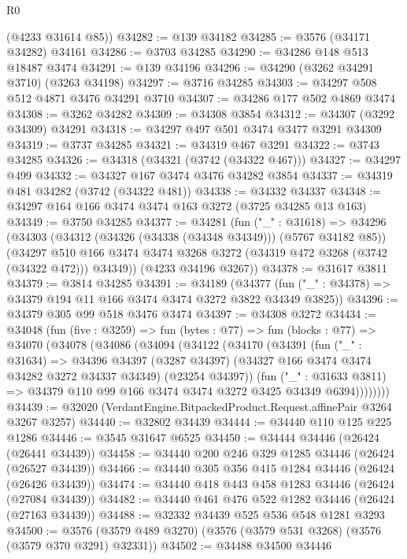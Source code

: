 \begin{lexlean}{R0}
\begin{coremodule}
      (@4233 @31614 @85))
@34282 := @139 @34182
@34285 := @3576 (@34171 @34282) @34161
@34286 := @3703 @34285
@34290 := @34286 @148 @513 @18487 @3474
@34291 := @139 @34196
@34296 := @34290 (@3262 @34291 @3710) (@3263 @34198)
@34297 := @3716 @34285
@34303 := @34297 @508 @512 @4871 @3476 @34291 @3710
@34307 := @34286 @177 @502 @4869 @3474
@34308 := @3262 @34282
@34309 := @34308 @3854
@34312 := @34307 (@3292 @34309) @34291
@34318 := @34297 @497 @501 @3474 @3477 @3291 @34309
@34319 := @3737 @34285
@34321 := @34319 @467 @3291
@34322 := @3743 @34285
@34326 := @34318 (@34321 (@3742 (@34322 @467)))
@34327 := @34297 @499
@34332 := @34327 @167 @3474 @3476 @34282 @3854
@34337 := @34319 @481 @34282 (@3742 (@34322 @481))
@34338 := @34332 @34337
@34348 := @34297 @164 @166 @3474 @3474 @163 @3272 (@3725 @34285 @13 @163)
@34349 := @3750 @34285
@34377 := @34281
    (fun ("_" : @31618) =>
    @34296
      (@34303
        (@34312 (@34326 (@34338 (@34348 @34349))) (@5767 @34182 @85))
        (@34297 @510 @166 @3474 @3474 @3268 @3272 (@34319 @472 @3268 (@3742 (@34322 @472))) @34349))
      (@4233 @34196 @3267))
@34378 := @31617 @3811
@34379 := @3814 @34285
@34391 := @34189
    (@34377 (fun ("_" : @34378) => @34379 @194 @11 @166 @3474 @3474 @3272 @3822 @34349 @3825))
@34396 := @34379 @305 @99 @518 @3476 @3474
@34397 := @34308 @3272
@34434 := @34048
    (fun (five : @3259) =>
    fun (bytes : @77) =>
    fun (blocks : @77) =>
    @34070
      (@34078
        (@34086
          (@34094
            (@34122
              (@34170
                (@34391
                  (fun ("_" : @31634) =>
                  @34396
                    @34397
                    (@3287 @34397)
                    (@34327 @166 @3474 @3474 @34282 @3272 @34337 @34349)
                    (@23254 @34397))
                  (fun ("_" : @31633 @3811) =>
                  @34379 @110 @99 @166 @3474 @3474 @3272 @3425 @34349 @6394))))))))
@34439 := @32020 (VerdantEngine.BitpackedProduct.Request.affinePair @3264 @3267 @3257)
@34440 := @32802 @34439
@34444 := @34440 @110 @125 @225 @1286
@34446 := @3545 @31647 @6525
@34450 := @34444 @34446 (@26424 (@26441 @34439))
@34458 := @34440 @200 @246 @329 @1285 @34446 (@26424 (@26527 @34439))
@34466 := @34440 @305 @356 @415 @1284 @34446 (@26424 (@26426 @34439))
@34474 := @34440 @418 @443 @458 @1283 @34446 (@26424 (@27084 @34439))
@34482 := @34440 @461 @476 @522 @1282 @34446 (@26424 (@27163 @34439))
@34488 := @32332 @34439 @525 @536 @548 @1281 @3293
@34500 := @3576 (@3579 @489 @3270) (@3576 (@3579 @531 @3268) (@3576 (@3579 @370 @3291) @32331))
@34502 := @34488 @34500 @34446

\end{coremodule}
\end{lexlean}
